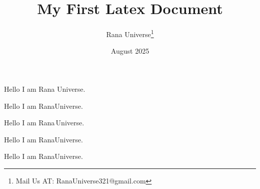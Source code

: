 \documentclass[12pt, letterpaper]{article}
\title{My First Latex Document}
\author{Rana Universe\thanks{Mail Us AT: RanaUniverse321@gmail.com}}
\date{August 2025}
\begin{document}
\maketitle


Hello I am Rana Universe.

Hello I am Rana\!Universe.


Hello I am Rana\,Universe.

Hello I am Rana\:Universe.

Hello I am Rana\;Universe.





\end{document}
